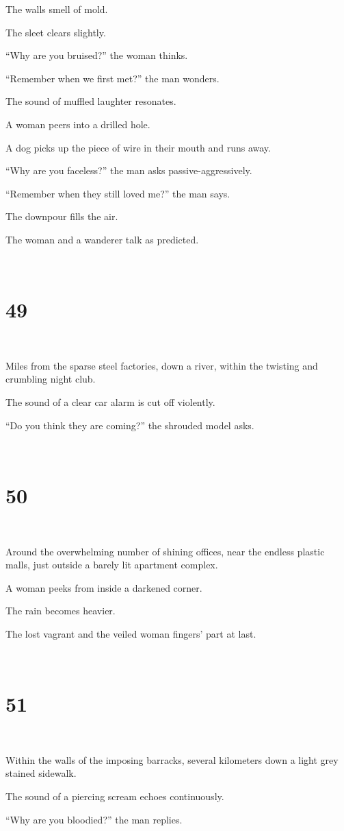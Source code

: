\documentclass{report}
\begin{document}
The walls smell of mold.

The sleet clears slightly.

``Why are you bruised?'' the woman thinks.

``Remember when we first met?'' the man wonders.

The sound of muffled laughter resonates.

A woman peers into a drilled hole.

A dog picks up the piece of wire in their mouth and runs away.

``Why are you faceless?'' the man asks passive-aggressively.

``Remember when they still loved me?'' the man says.

The downpour fills the air.

The woman and a wanderer talk as predicted.

~
\chapter*{49}
~

Miles from the sparse steel factories, down a river, within the twisting and crumbling night club.

The sound of a clear car alarm is cut off violently.

``Do you think they are coming?'' the shrouded model asks.

~
\chapter*{50}
~

Around the overwhelming number of shining offices, near the endless plastic malls, just outside a barely lit apartment complex.

A woman peeks from inside a darkened corner.

The rain becomes heavier.

The lost vagrant and the veiled woman fingers' part at last.

~
\chapter*{51}
~

Within the walls of the imposing barracks, several kilometers down a light grey stained sidewalk.

The sound of a piercing scream echoes continuously.

``Why are you bloodied?'' the man replies.
\end{document}
